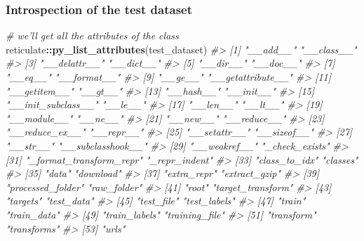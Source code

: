 \documentclass[]{book}
\newenvironment{Shaded}{\begin{snugshade}}{\end{snugshade}}
\newcommand{\CommentTok}[1]{\textcolor[rgb]{0.56,0.35,0.01}{\textit{#1}}}
\newcommand{\KeywordTok}[1]{\textcolor[rgb]{0.13,0.29,0.53}{\textbf{#1}}}
\newcommand{\NormalTok}[1]{#1}
\newcommand{\OperatorTok}[1]{\textcolor[rgb]{0.81,0.36,0.00}{\textbf{#1}}}
\begin{document}
\hypertarget{introspection-of-the-test-dataset}{%
\subsubsection{Introspection of the test dataset}\label{introspection-of-the-test-dataset}}

\begin{Shaded}
\begin{Highlighting}[]
\CommentTok{# we'll get all the attributes of the class}
\NormalTok{reticulate}\OperatorTok{::}\KeywordTok{py_list_attributes}\NormalTok{(test_dataset)}
\CommentTok{#>  [1] "__add__"                "__class__"             }
\CommentTok{#>  [3] "__delattr__"            "__dict__"              }
\CommentTok{#>  [5] "__dir__"                "__doc__"               }
\CommentTok{#>  [7] "__eq__"                 "__format__"            }
\CommentTok{#>  [9] "__ge__"                 "__getattribute__"      }
\CommentTok{#> [11] "__getitem__"            "__gt__"                }
\CommentTok{#> [13] "__hash__"               "__init__"              }
\CommentTok{#> [15] "__init_subclass__"      "__le__"                }
\CommentTok{#> [17] "__len__"                "__lt__"                }
\CommentTok{#> [19] "__module__"             "__ne__"                }
\CommentTok{#> [21] "__new__"                "__reduce__"            }
\CommentTok{#> [23] "__reduce_ex__"          "__repr__"              }
\CommentTok{#> [25] "__setattr__"            "__sizeof__"            }
\CommentTok{#> [27] "__str__"                "__subclasshook__"      }
\CommentTok{#> [29] "__weakref__"            "_check_exists"         }
\CommentTok{#> [31] "_format_transform_repr" "_repr_indent"          }
\CommentTok{#> [33] "class_to_idx"           "classes"               }
\CommentTok{#> [35] "data"                   "download"              }
\CommentTok{#> [37] "extra_repr"             "extract_gzip"          }
\CommentTok{#> [39] "processed_folder"       "raw_folder"            }
\CommentTok{#> [41] "root"                   "target_transform"      }
\CommentTok{#> [43] "targets"                "test_data"             }
\CommentTok{#> [45] "test_file"              "test_labels"           }
\CommentTok{#> [47] "train"                  "train_data"            }
\CommentTok{#> [49] "train_labels"           "training_file"         }
\CommentTok{#> [51] "transform"              "transforms"            }
\CommentTok{#> [53] "urls"}
\end{Highlighting}
\end{Shaded}
\end{document}
